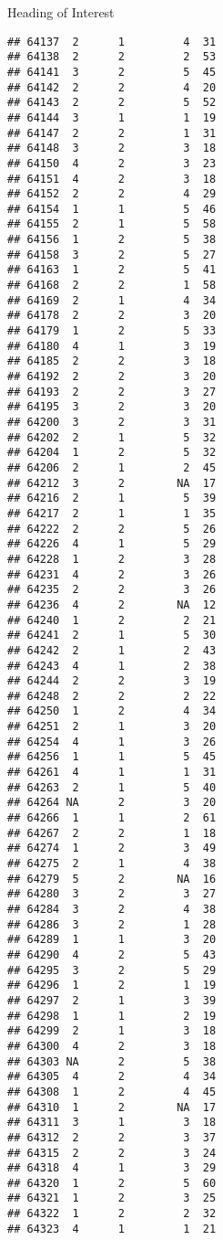 \documentclass[
  ignorenonframetext,
]{beamer}
\begin{document}
\begin{frame}[fragile]{Heading of Interest}
\begin{verbatim}
## 64137  2      1         4  31
## 64138  2      2         2  53
## 64141  3      2         5  45
## 64142  2      2         4  20
## 64143  2      2         5  52
## 64144  3      1         1  19
## 64147  2      2         1  31
## 64148  3      2         3  18
## 64150  4      2         3  23
## 64151  4      2         3  18
## 64152  2      2         4  29
## 64154  1      1         5  46
## 64155  2      1         5  58
## 64156  1      2         5  38
## 64158  3      2         5  27
## 64163  1      2         5  41
## 64168  2      2         1  58
## 64169  2      1         4  34
## 64178  2      2         3  20
## 64179  1      2         5  33
## 64180  4      1         3  19
## 64185  2      2         3  18
## 64192  2      2         3  20
## 64193  2      2         3  27
## 64195  3      2         3  20
## 64200  3      2         3  31
## 64202  2      1         5  32
## 64204  1      2         5  32
## 64206  2      1         2  45
## 64212  3      2        NA  17
## 64216  2      1         5  39
## 64217  2      1         1  35
## 64222  2      2         5  26
## 64226  4      1         5  29
## 64228  1      2         3  28
## 64231  4      2         3  26
## 64235  2      2         3  26
## 64236  4      2        NA  12
## 64240  1      2         2  21
## 64241  2      1         5  30
## 64242  2      1         2  43
## 64243  4      1         2  38
## 64244  2      2         3  19
## 64248  2      2         2  22
## 64250  1      2         4  34
## 64251  2      1         3  20
## 64254  4      1         3  26
## 64256  1      1         5  45
## 64261  4      1         1  31
## 64263  2      1         5  40
## 64264 NA      2         3  20
## 64266  1      1         2  61
## 64267  2      2         1  18
## 64274  1      2         3  49
## 64275  2      1         4  38
## 64279  5      2        NA  16
## 64280  3      2         3  27
## 64284  3      2         4  38
## 64286  3      2         1  28
## 64289  1      1         3  20
## 64290  4      2         5  43
## 64295  3      2         5  29
## 64296  1      2         1  19
## 64297  2      1         3  39
## 64298  1      1         2  19
## 64299  2      1         3  18
## 64300  4      2         3  18
## 64303 NA      2         5  38
## 64305  4      2         4  34
## 64308  1      2         4  45
## 64310  1      2        NA  17
## 64311  3      1         3  18
## 64312  2      2         3  37
## 64315  2      2         3  24
## 64318  4      1         3  29
## 64320  1      2         5  60
## 64321  1      2         3  25
## 64322  1      2         2  32
## 64323  4      1         1  21

\end{verbatim}
\end{frame}
\end{document}
